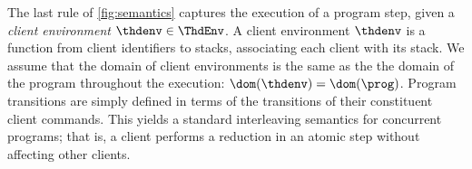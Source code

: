 The last rule of \cref{fig:semantics} captures the execution of a program step, 
given a \emph{client environment} $\thdenv \in \ThdEnv$. 
A client environment $\thdenv$ is a function from client identifiers to stacks, associating each client with its stack. 
We assume that the domain of client environments is the same as the
the domain of the program throughout the execution: 
$\dom(\thdenv) = \dom(\prog)$.
Program transitions are simply defined in terms of the transitions of
their constituent client commands. 
This  yields a  standard interleaving semantics for concurrent
programs; 
that is, 
a client performs a reduction in an atomic step without
affecting other clients. 
